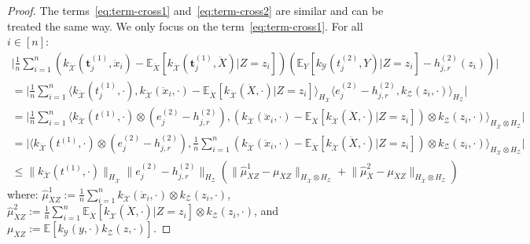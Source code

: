 \begin{proof}
The terms~\eqref{eq:term-cross1} and~\eqref{eq:term-cross2} are similar and can be treated the same way. We only focus on the term~\eqref{eq:term-cross1}. For all $i\in[n]$:
\begin{align*}
\lvert\frac1n\sum_{i=1}^n\left(k_{\mathcal{\ddot{X}}}(\mathbf{t}^{(1)}_j,\ddot{x}_i)-\mathbb{E}_{\ddot{X}}\left[k_{\mathcal{\ddot{X}}}(\mathbf{t}^{(1)}_j,\ddot{X})|Z=z_i\right]\right)\left(\mathbb{E}_{Y}\left[k_{\mathcal{Y}}(t^{(2)}_j,Y)|Z=z_i\right]- h^{(2)}_{j,r}(z_i)\right)\rvert\\
  =\lvert\frac1n\sum_{i=1}^n\langle k_{\mathcal{\ddot{X}}}(t^{(1)}_j,\cdot),k_{\mathcal{\ddot{X}}}(\ddot{x}_i,\cdot)-\mathbb{E}_{\ddot{X}}\left[k_{\mathcal{\ddot{X}}}(\ddot{X},\cdot)|Z=z_i\right]\rangle_{ H_\mathcal{\ddot{X}}}
  \langle e^{(2)}_{j}-h^{(2)}_{j,r},k_{\mathcal{Z}}(z_i,\cdot)\rangle_{ H_\mathcal{Z}}\rvert\\
  =\lvert\frac1n\sum_{i=1}^n\langle k_{\mathcal{\ddot{X}}}(t^{(1)},\cdot)\otimes \left(e^{(2)}_{j}-h^{(2)}_{j,r}\right),\left(k_{\mathcal{\ddot{X}}}(\ddot{x}_i,\cdot)-\mathbb{E}_{\ddot{X}}\left[k_{\mathcal{\ddot{X}}}(\ddot{X},\cdot)|Z=z_i\right]\right)\otimes k_{\mathcal{Z}}(z_i,\cdot)\rangle_{ H_\mathcal{\ddot{X}}\otimes H_\mathcal{Z}}\rvert\\
  =\lvert\langle k_{\mathcal{\ddot{X}}}(t^{(1)},\cdot)\otimes \left(e^{(2)}_{j}-h^{(2)}_{j,r}\right),\frac1n\sum_{i=1}^n\left(k_{\mathcal{\ddot{X}}}(\ddot{x}_i,\cdot)-\mathbb{E}_{\ddot{X}}\left[k_{\mathcal{\ddot{X}}}(\ddot{X},\cdot)|Z=z_i\right]\right)\otimes k_{\mathcal{Z}}(z_i,\cdot)\rangle_{ H_\mathcal{\ddot{X}}\otimes H_\mathcal{Z}}\rvert\\
  \leq \lVert k_{\mathcal{\ddot{X}}}(t^{(1)},\cdot)\rVert_{ H_\mathcal{\ddot{X}}}\lVert e^{(2)}_{j}-h^{(2)}_{j,r}\rVert_{H_\mathcal{Z}}\left(\lVert \hat{\mu}^1_{\ddot{X}Z}-\mu_{\ddot{X}Z}\rVert_{ H_\mathcal{\ddot{X}}\otimes H_\mathcal{Z}}+ \lVert\hat{\mu}^2_{\ddot{X}}-\mu_{\ddot{X}Z}\rVert_{ H_\mathcal{\ddot{X}}\otimes H_\mathcal{Z}}\right)
\end{align*}
where: $\hat{\mu}^1_{\ddot{X}Z} := \frac1n\sum_{i=1}^nk_{\mathcal{\ddot{X}}}(\ddot{x}_i,\cdot)\otimes k_{\mathcal{Z}}(z_i,\cdot)$, $\hat{\mu}^2_{\ddot{X}Z}:=\frac1n\sum_{i=1}^n\mathbb{E}_{\ddot{X}}\left[k_{\mathcal{\ddot{X}}}(\ddot{X},\cdot)|Z=z_i\right]\otimes k_{\mathcal{Z}}(z_i,\cdot)$, and $\mu_{\ddot{X}Z}:=\mathbb{E}\left[k_{\mathcal{Y}}(y,\cdot)k_{\mathcal{Z}}(z,\cdot)\right]$.


\end{proof}
